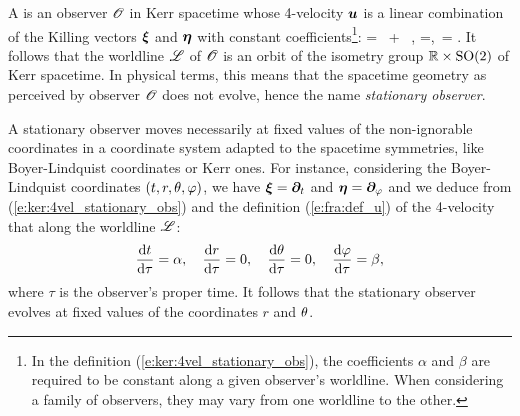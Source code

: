 A 
is an observer $\mathscr{O}$ in Kerr spacetime whose 4-velocity $\bm{u}$ is a linear
combination of the Killing vectors $\bm{\xi}$ and $\bm{\eta}$ with constant coefficients\footnote{In
the definition (\ref{e:ker:4vel_stationary_obs}), the coefficients $\alpha$ and $\beta$
are required to be constant along a given observer's worldline. When considering a family of observers,
they may vary from one worldline to the other.}:
\be \label{e:ker:4vel_stationary_obs}
     = \alpha \, \w{\xi} + \beta \, \w{\eta} , \qquad \alpha=,\ \beta= .
\ee
It follows that the worldline $\mathscr{L}$ of $\mathscr{O}$ is an
orbit of the isometry group $\mathbb{R}\times\mathrm{SO}(2)$ of Kerr spacetime. In physical terms,
this means that the spacetime geometry as perceived by observer $\mathscr{O}$ does not evolve,
hence the name \emph{stationary observer}.

A stationary observer moves necessarily at fixed values of the non-ignorable coordinates
in a coordinate system adapted to the spacetime symmetries, like Boyer-Lindquist coordinates or Kerr
ones. For instance, considering the Boyer-Lindquist coordinates $(t, r, \theta, \varphi)$,
we have $\bm{\xi} = \bm{\partial}_t$ and $\bm{\eta} = \bm{\partial}_\varphi$ and
we deduce from (\ref{e:ker:4vel_stationary_obs}) and the definition (\ref{e:fra:def_u}) of the
4-velocity that along the worldline $\mathscr{L}$:
\[
    \frac{\mathrm{d} t}{\mathrm{d}\tau} = \alpha,\quad
    \frac{\mathrm{d} r}{\mathrm{d}\tau} = 0,\quad
    \frac{\mathrm{d} \theta}{\mathrm{d}\tau} = 0,\quad
    \frac{\mathrm{d} \varphi}{\mathrm{d}\tau} = \beta,
\]
where $\tau$ is the observer's proper time. It follows that
the stationary observer evolves at fixed values of the coordinates $r$ and $\theta$.

